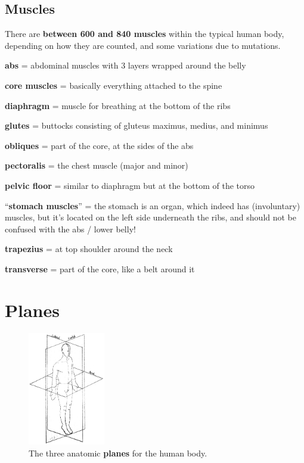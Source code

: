 \subsection{Muscles}\label{subsec:muscles}

There are \textbf{between 600 and 840 muscles} within the typical human body, depending on how they are counted, and some variations due to mutations.

\begin{itemize*}
    \item \textbf{abs} = abdominal muscles with 3 layers wrapped around the belly
    \item \textbf{core muscles} = basically everything attached to the spine
    \item \textbf{diaphragm} = muscle for breathing at the bottom of the ribs
    \item \textbf{glutes} = buttocks consisting of gluteus maximus, medius, and minimus
    \item \textbf{obliques} = part of the core, at the sides of the abs
    \item \textbf{pectoralis} = the chest muscle (major and minor)
    \item \textbf{pelvic floor} = similar to diaphragm but at the bottom of the torso
    \item ``\textbf{stomach muscles}'' = the stomach is an organ, which indeed has (involuntary) muscles, but it's located on the left side underneath the ribs, and should not be confused with the abs / lower belly!
    \item \textbf{trapezius} = at top shoulder around the neck
    \item \textbf{transverse} = part of the core, like a belt around it
\end{itemize*}

\section{Planes}\label{sec:planes}

\begin{figure}
    \centering
    \includegraphics[width=0.3\textwidth]{images/anatomy/planes}
    \caption{The three anatomic \textbf{planes} for the human body.}
\end{figure}

